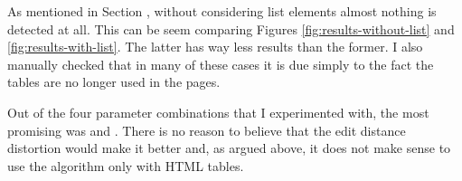 \documentclass[10pt]{article}
\begin{document}
As mentioned in Section , without considering list elements almost nothing is detected at all. This can be seem comparing Figures \ref{fig:results-without-list} and \ref{fig:results-with-list}. The latter has way less results than the former. I also manually checked that in many of these cases it is due simply to the fact the tables are no longer used in the pages.

Out of the four parameter combinations that I experimented with, the most promising was  and . There is no reason to believe that the edit distance distortion would make it better and, as argued above, it does not make sense to use the algorithm only with HTML tables.

\begin{figure}[!b]

    \centering
    
    \begin{subfigure}[b]{.49\textwidth}
        

\end{subfigure}
\end{figure}
\end{document}
